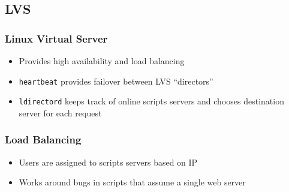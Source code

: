 \subsection{LVS}

\begin{frame}
  \frametitle{Linux Virtual Server}
  \begin{itemize}
    \item Provides high availability and load balancing
    \item {\tt heartbeat} provides failover between LVS ``directors''
    \item {\tt ldirectord} keeps track of online scripts servers and chooses destination server for each request
  \end{itemize}
\end{frame}

\begin{frame}
  \frametitle{Load Balancing}
  \begin{itemize}
    \item Users are assigned to scripts servers based on IP
    \item Works around bugs in scripts that assume a single web server
  \end{itemize}
  \begin{center}
  \end{center}
\end{frame}

